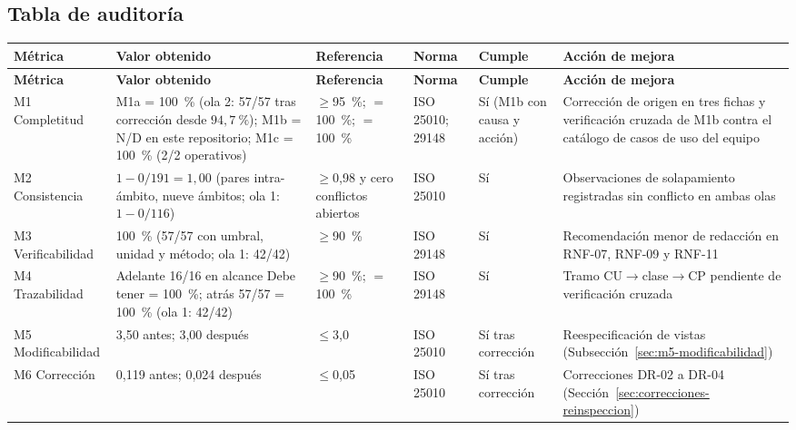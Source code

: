 \subsection{Tabla de auditoría}
\label{sec:tabla-auditoria}

\begin{center}
\begin{longtable}{|p{2.4cm}|p{3.0cm}|p{2.2cm}|p{1.9cm}|p{1.2cm}|p{2.8cm}|}
\hline
\textbf{Métrica} & \textbf{Valor obtenido} & \textbf{Referencia} & \textbf{Norma} & \textbf{Cumple} & \textbf{Acción de mejora} \\
\hline
\endfirsthead
\hline
\textbf{Métrica} & \textbf{Valor obtenido} & \textbf{Referencia} & \textbf{Norma} & \textbf{Cumple} & \textbf{Acción de mejora} \\
\hline
\endhead
\hline
\endfoot
\hline
\endlastfoot
M1 Completitud & M1a = 100~\% (ola 2: 57/57 tras corrección desde $94{,}7~\%$); M1b = N/D en este repositorio; M1c = 100~\% (2/2 operativos) & $\geq$95~\%; $=$100~\%; $=$100~\% & ISO 25010; 29148 & Sí (M1b con causa y acción) & Corrección de origen en tres fichas y verificación cruzada de M1b contra el catálogo de casos de uso del equipo \\
\hline
M2 Consistencia & $1 - 0/191 = 1{,}00$ (pares intra-ámbito, nueve ámbitos; ola 1: $1 - 0/116$) & $\geq$0,98 y cero conflictos abiertos & ISO 25010 & Sí & Observaciones de solapamiento registradas sin conflicto en ambas olas \\
\hline
M3 Verificabilidad & 100~\% (57/57 con umbral, unidad y método; ola 1: 42/42) & $\geq$90~\% & ISO 29148 & Sí & Recomendación menor de redacción en RNF-07, RNF-09 y RNF-11 \\
\hline
M4 Trazabilidad & Adelante 16/16 en alcance Debe tener = 100~\%; atrás 57/57 = 100~\% (ola 1: 42/42) & $\geq$90~\%; $=$100~\% & ISO 29148 & Sí & Tramo CU$\rightarrow$clase$\rightarrow$CP pendiente de verificación cruzada \\
\hline
M5 Modificabilidad & 3,50 antes; 3,00 después & $\leq$3,0 & ISO 25010 & Sí tras corrección & Reespecificación de vistas (Subsección~\ref{sec:m5-modificabilidad}) \\
\hline
M6 Corrección & 0,119 antes; 0,024 después & $\leq$0,05 & ISO 25010 & Sí tras corrección & Correcciones DR-02 a DR-04 (Sección~\ref{sec:correcciones-reinspeccion}) \\
\hline
\end{longtable}
\label{tab:auditoria-metricas}
\end{center}

